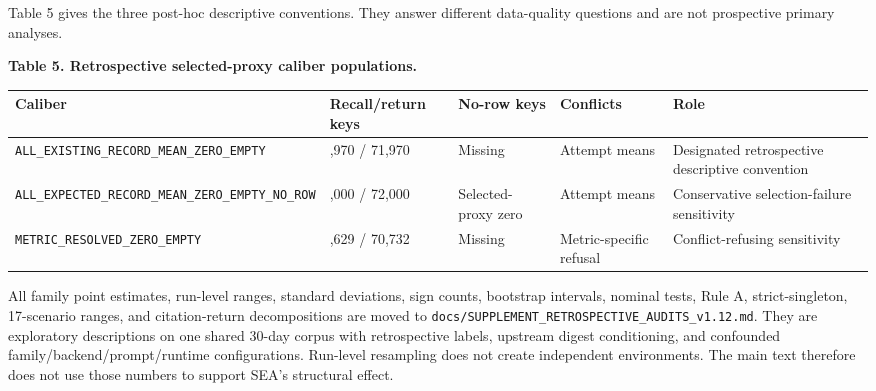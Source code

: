 \documentclass[
  11pt]{article}
\begin{document}
Table 5 gives the three post-hoc descriptive conventions. They answer
different data-quality questions and are not prospective primary
analyses.

\textbf{Table 5. Retrospective selected-proxy caliber populations.}

\begin{longtable}[]{@{}
  >{\raggedright\arraybackslash}p{}
  >{\raggedleft\arraybackslash}p{}
  >{\raggedright\arraybackslash}p{}
  >{\raggedright\arraybackslash}p{}
  >{\raggedright\arraybackslash}p{}@{}}
\toprule\noalign{}
\begin{minipage}[b]{\linewidth}\raggedright
Caliber
\end{minipage} & \begin{minipage}[b]{\linewidth}\raggedleft
Recall/return keys
\end{minipage} & \begin{minipage}[b]{\linewidth}\raggedright
No-row keys
\end{minipage} & \begin{minipage}[b]{\linewidth}\raggedright
Conflicts
\end{minipage} & \begin{minipage}[b]{\linewidth}\raggedright
Role
\end{minipage} \\
\midrule\noalign{}
\endhead
\bottomrule\noalign{}
\endlastfoot
\texttt{ALL\_EXISTING\_}\allowbreak \texttt{RECORD\_MEAN\_}\allowbreak \texttt{ZERO\_EMPTY}
& 71,970 / 71,970 & Missing & Attempt means & Designated retrospective
descriptive convention \\
\texttt{ALL\_EXPECTED\_}\allowbreak \texttt{RECORD\_MEAN\_}\allowbreak \texttt{ZERO\_EMPTY\_}\allowbreak \texttt{NO\_ROW}
& 72,000 / 72,000 & Selected-proxy zero & Attempt means & Conservative
selection-failure sensitivity \\
\texttt{METRIC\_RESOLVED\_}\allowbreak \texttt{ZERO\_EMPTY} & 71,629 /
70,732 & Missing & Metric-specific refusal & Conflict-refusing
sensitivity \\
\end{longtable}

All family point estimates, run-level ranges, standard deviations, sign
counts, bootstrap intervals, nominal tests, Rule A, strict-singleton,
17-scenario ranges, and citation-return decompositions are moved to
\texttt{docs/SUPPLEMENT\_RETROSPECTIVE\_AUDITS\_v1.12.md}. They are
exploratory descriptions on one shared 30-day corpus with retrospective
labels, upstream digest conditioning, and confounded
family/backend/prompt/runtime configurations. Run-level resampling does
not create independent environments. The main text therefore does not
use those numbers to support SEA's structural effect.
\end{document}
